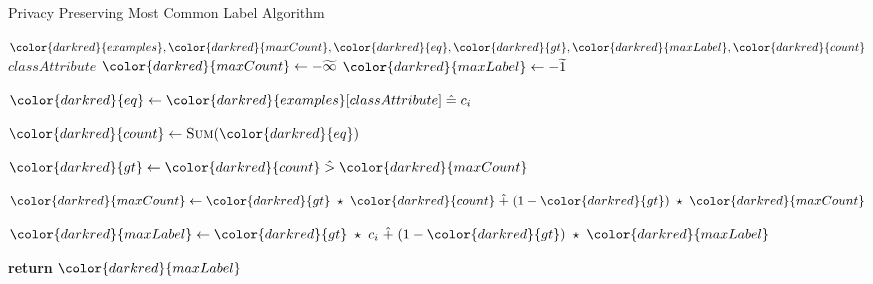 \begin{algorithm}[H]
\caption{Privacy Preserving Most Common Label Algorithm}\label{a:id3-most-common-label-pp}
\begin{algorithmic}[1]
\renewcommand{\algorithmicrequire}{\textbf{Private Vars:}}
\Require ${\color{darkred}{examples}}, {\color{darkred}{maxCount}}, {\color{darkred}{eq}}, {\color{darkred}{gt}}, {\color{darkred}{maxLabel}}, {\color{darkred}{count}}$
\renewcommand{\algorithmicrequire}{\textbf{Global Vars:}}
\Require $classAttribute$
  \State ${\color{darkred}{maxCount}} \gets -\enc{\infty}$
  \State ${\color{darkred}{maxLabel}} \gets -\enc{1}$


      \State ${\color{darkred}{eq}} \gets {\color{darkred}{examples}}[classAttribute] \heq c_i$ 

      \State ${\color{darkred}{count}} \gets \textsc{Sum}({\color{darkred}{eq}})$

      \State ${\color{darkred}{gt}} \gets {\color{darkred}{count}} \hgt  {\color{darkred}{maxCount}}$

      \State ${\color{darkred}{maxCount}} \gets {\color{darkred}{gt}} \hmul {\color{darkred}{count}} \hplus (1 - {\color{darkred}{gt}}) \hmul {\color{darkred}{maxCount}}$ 

      \State ${\color{darkred}{maxLabel}} \gets {\color{darkred}{gt}} \hmul c_i \hplus (1 - {\color{darkred}{gt}}) \hmul {\color{darkred}{maxLabel}}$


    \EndFor

    \State \textbf{return} ${\color{darkred}{maxLabel}}$
\EndProcedure
\end{algorithmic}
\end{algorithm}
